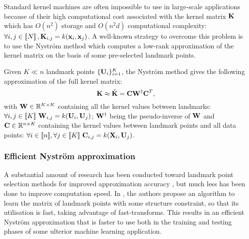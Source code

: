 Standard kernel machines are often impossible to use in large-scale applications because of their high computational cost associated with the kernel matrix ${\mathbf{K}}$ which has $O(n^2)$ storage and $O(n^2d)$ computational complexity: $\forall i,j \in\left \llbracket N\right \rrbracket, {\mathbf{K}}_{i,j} = k({\mathbf{x}}_i, {\mathbf{x}}_j)$. A well-known strategy to overcome this problem is to use the Nyström method which computes a low-rank approximation of the kernel matrix on the basis of some pre-selected landmark points. 

Given $K \ll n$ landmark points $\{{\mathbf{U}}_i\}_{i=1}^{K}$, the Nyström method gives the following approximation of the full kernel matrix:
%
\begin{equation}
 \label{eq:nystrom}
 {\mathbf{K}} \approx \tilde{{\mathbf{K}}} = {\mathbf{C}}{\mathbf{W}}^\dagger{\mathbf{C}}^T,
\end{equation}
%
with ${\mathbf{W}} \in \mathbb{R}^{K \times K}$ containing all the kernel values between landmarks: $\forall i,j \in [\![K]\!]~ {\mathbf{W}}_{i,j} = k({\mathbf{U}}_i, {\mathbf{U}}_j)$; ${\mathbf{W}}^\dagger$ being the pseudo-inverse of ${\mathbf{W}}$ and ${\mathbf{C}} \in \mathbb{R}^{n \times K}$ containing the kernel values between landmark points and all data points: $\forall i \in [\![n]\!], \forall j \in [\![K]\!]~ {\mathbf{C}}_{i, j} = k({\mathbf{X}}_i, {\mathbf{U}}_j)$.

\subsubsection{Efficient Nyström approximation}

A substantial amount of research has been conducted toward landmark point selection methods for improved approximation accuracy \cite{kumar2012sampling} \cite{musco2017recursive}, but much less has been done to improve computation speed. In \cite{si2016computationally}, the authors propose an algorithm to learn the matrix of landmark points with some structure constraint, so that its utilisation is fast, taking advantage of fast-transforms. This results in an efficient Nyström approximation that is faster to use both in the training and testing phases of some ulterior machine learning application.

